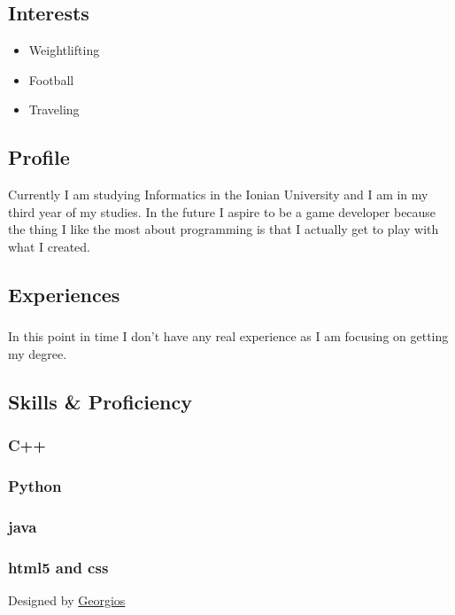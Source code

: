 \documentclass[english,]{article}
\providecommand{\tightlist}{%
  \setlength{\itemsep}{0pt}\setlength{\parskip}{0pt}}
\begin{document}
\hypertarget{interests}{%
\subsection{Interests}\label{interests}}

\begin{itemize}
\tightlist
\item
  Weightlifting
\item
  Football
\item
  Traveling
\end{itemize}

\hypertarget{profile}{%
\subsection{\texorpdfstring{{ \emph{} \emph{} }
Profile}{    Profile}}\label{profile}}

Currently I am studying Informatics in the Ionian University and I am in
my third year of my studies. In the future I aspire to be a game
developer because the thing I like the most about programming is that I
actually get to play with what I created.

\hypertarget{experiences}{%
\subsection{\texorpdfstring{{ \emph{} \emph{} }
Experiences}{    Experiences}}\label{experiences}}

\hypertarget{section}{%
\subsubsection{}\label{section}}

In this point in time I don't have any real experience as I am focusing
on getting my degree.

\hypertarget{skills-proficiency}{%
\subsection{\texorpdfstring{{ \emph{} \emph{} } Skills \&
Proficiency}{    Skills \& Proficiency}}\label{skills-proficiency}}

\hypertarget{c}{%
\subsubsection{C++}\label{c}}

\hypertarget{python}{%
\subsubsection{Python}\label{python}}

\hypertarget{java}{%
\subsubsection{java}\label{java}}

\hypertarget{html5-and-css}{%
\subsubsection{html5 and css}\label{html5-and-css}}

{Designed by \href{https://github.com/p19papa4}{Georgios}}
\end{document}
